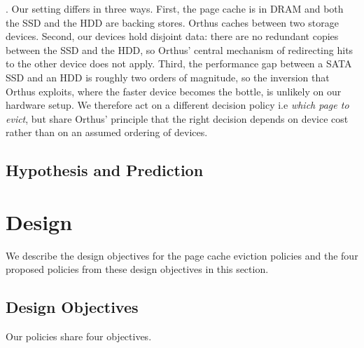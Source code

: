 \documentclass[11pt,sigconf,nonacm]{acmart}
\begin{document}
. Our setting differs in three ways. First, the page cache is in DRAM and both the SSD and the HDD are backing stores. Orthus caches between two storage devices. Second, our devices hold disjoint data: there are no redundant copies between the SSD and the HDD, so Orthus' central mechanism of redirecting hits to the other device does not apply. Third, the performance gap between a SATA SSD and an HDD is roughly two orders of magnitude, so the inversion that Orthus exploits, where the faster device becomes the bottle, is unlikely on our hardware setup. We therefore act on a different decision policy i.e \textit{which page to evict}, but share Orthus' principle that the right decision depends on device cost rather than on an assumed ordering of devices.

\subsection{Hypothesis and Prediction}

\section{Design}

We describe the design objectives for the page cache eviction policies and the four proposed policies from these design objectives in this section. 

\subsection{Design Objectives}


Our policies share four objectives.
\end{document}
